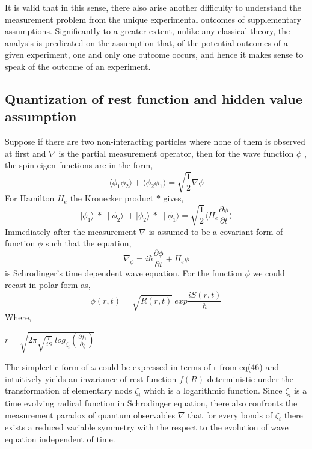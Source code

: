 \documentclass{article}
\begin{document}
It is valid that in this sense, there also arise another difficulty
to understand the measurement problem from the unique experimental outcomes of supplementary assumptions\cite{22}. Significantly to a greater extent, unlike any classical theory, the  analysis is predicated on the assumption that, of the potential outcomes of a given experiment, one and only one outcome occurs, and hence it makes sense to speak of the outcome of an experiment.
\subsection{Quantization of rest function and hidden value assumption}
Suppose if there are two non-interacting particles where none of them is observed at first and $\nabla$ is the partial measurement operator, then for the wave function $\phi$ , the spin eigen functions are in the form,
 \begin{equation}
     \langle \phi_1 \phi_2 \rangle  +   \langle \phi_2 \phi_1 \rangle = \sqrt{\frac{1}{2}} \nabla \phi 
 \end{equation}
 For Hamilton $H_e$ the Kronecker product $*$ gives, \begin{equation}
     \mid \phi_1 \rangle \ * \ \mid \phi_2 \rangle \ + \mid \phi_2 \rangle \ * \ \mid \phi_1 \rangle = \sqrt{\frac{1}{2}} \langle H_e \frac{\partial \phi}{\partial t} \rangle 
 \end{equation} Immediately after the measurement $\nabla$ is assumed to be a covariant form of function $\phi$ such that the equation, \begin{equation}
      \nabla_\phi = i \hbar \frac{\partial \phi}{\partial t} + H_e \phi 
 \end{equation} is Schrodinger's time dependent wave equation. For the function $\phi$ we could recast in polar form as,
 \begin{equation}
    \phi (r,t) = \sqrt{R(r,t)} \ exp \frac{iS(r,t)}{\hbar} 
 \end{equation} Where,
 \begin{center}
 \begin{math}
      r = \sqrt{2 \pi \sqrt{\frac{r}{iS}}\ log_{\zeta_i}(\frac{\partial f_{1}}{\partial_{\zeta}})} 
 \end{math}
 \end{center} The simplectic form of $\omega$ could be expressed in terms of r from eq(46) and intuitively yields an invariance  of rest function $f(R)$ deterministic under the transformation of elementary nods $\zeta_i$ which is a logarithmic function. Since $\zeta_i$ is a time evolving radical function in Schrodinger equation, there also confronts the measurement paradox of quantum observables $\nabla$ that for every bonds of $\zeta_i$ there exists a reduced variable symmetry with the respect to the evolution of wave equation independent of time.
\end{document}
